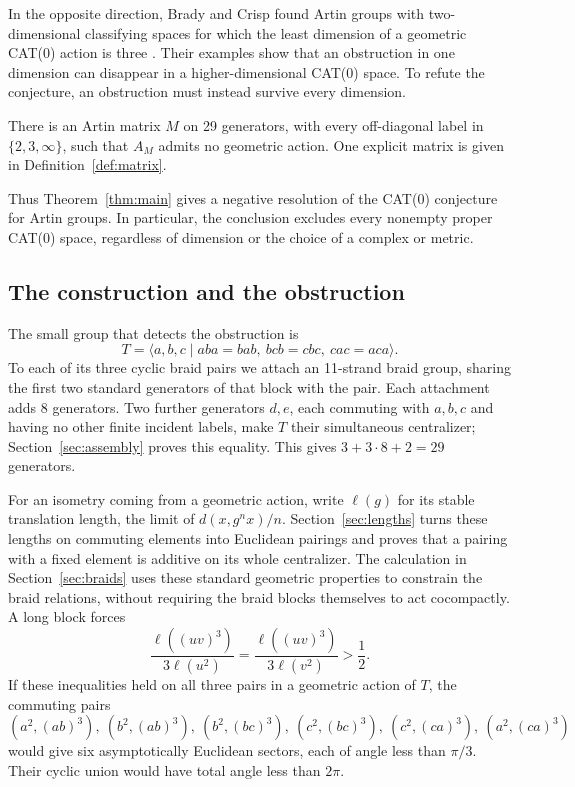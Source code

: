 In the opposite direction, Brady and Crisp found Artin groups with
two-dimensional classifying spaces for which the least dimension of
a geometric CAT(0) action is three
\cite[preprint Theorems~B and~3.1]{BradyCrisp2002}.
Their examples show that an
obstruction in one dimension can disappear in a higher-dimensional
CAT(0) space.  To refute the conjecture, an obstruction must instead
survive every dimension.

\begin{theorem}\label{thm:main}
There is an Artin matrix \(M\) on 29 generators, with every
off-diagonal label in \(\{2,3,\infty\}\), such that \(A_M\) admits no
geometric action.  One explicit matrix is given in
Definition~\ref{def:matrix}.
\end{theorem}

Thus Theorem~\ref{thm:main} gives a negative resolution of the
CAT(0) conjecture for Artin groups.
In particular, the conclusion excludes every nonempty proper CAT(0)
space, regardless of dimension or the choice of a complex or metric.

\subsection*{The construction and the obstruction}

The small group that detects the obstruction is
\[
 T=\langle a,b,c\mid aba=bab,\ bcb=cbc,\ cac=aca\rangle.
\]
To each of its three cyclic braid pairs we attach an 11-strand braid
group, sharing the first two standard generators of that block with the
pair.  Each attachment adds 8 generators.  Two further generators
\(d,e\), each commuting with \(a,b,c\) and having no other finite
incident labels, make \(T\) their simultaneous centralizer;
Section~\ref{sec:assembly} proves this equality.  This gives \(3+3\cdot8+2=29\) generators.

For an isometry coming from a geometric action, write \(\ell(g)\) for its
stable translation length, the limit of \(d(x,g^n x)/n\).
Section~\ref{sec:lengths} turns these lengths on commuting elements into
Euclidean pairings and proves that a pairing with a fixed element is
additive on its whole centralizer.  The calculation in
Section~\ref{sec:braids} uses these standard geometric properties to
constrain the braid relations, without requiring the braid blocks
themselves to act cocompactly.  A long block forces
\[
 \frac{\ell((uv)^3)}{3\ell(u^2)}
 =\frac{\ell((uv)^3)}{3\ell(v^2)}>\frac12.
\]
If these inequalities held on all three pairs in a geometric action of
\(T\), the commuting pairs
\[
 (a^2,(ab)^3),\ (b^2,(ab)^3),\
 (b^2,(bc)^3),\ (c^2,(bc)^3),\
 (c^2,(ca)^3),\ (a^2,(ca)^3)
\]
would give six asymptotically Euclidean sectors, each of angle less than
\(\pi/3\).  Their cyclic union would have total angle less than \(2\pi\).

